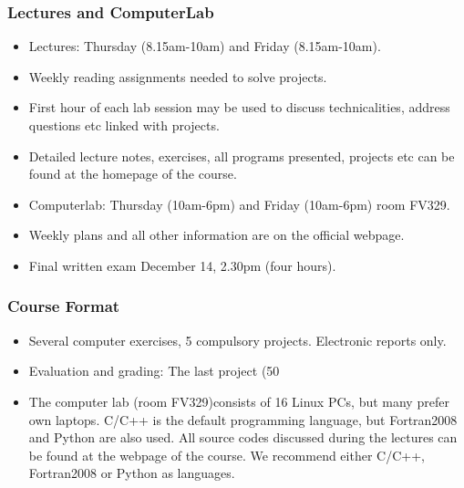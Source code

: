 \documentclass{beamer}
\newenvironment{block_mdfboxadmon}[1][]{\begin{block}{#1}}{\end{block}}
\begin{document}
\begin{frame}
\frametitle{Lectures and ComputerLab}

\begin{block_mdfboxadmon}[]
\begin{itemize}
  \item Lectures: Thursday (8.15am-10am) and Friday (8.15am-10am).

  \item Weekly reading assignments needed to solve projects.

  \item First hour of each lab session may be used to discuss technicalities, address questions etc linked with projects.

  \item Detailed lecture notes, exercises, all programs presented, projects etc can be found at the homepage of the course.

  \item Computerlab: Thursday (10am-6pm) and Friday (10am-6pm) room FV329.

  \item Weekly plans and all other information are on the official webpage.

  \item Final written exam December 14, 2.30pm (four hours).
\end{itemize}

\noindent
\end{block_mdfboxadmon}
\end{frame}

\begin{frame}
\frametitle{Course Format}

\begin{block_mdfboxadmon}[]
\begin{itemize}
  \item Several computer exercises, 5 compulsory projects. Electronic reports only.

  \item Evaluation and grading: The last project (50%

  \item The computer lab (room FV329)consists of 16 Linux PCs, but many prefer own laptops. C/C++ is the default programming language, but Fortran2008 and Python are also used. All source codes discussed during the lectures can be found at the webpage of the course. We recommend either C/C++, Fortran2008 or Python as languages.
\end{itemize}

\noindent
\end{block_mdfboxadmon}
\end{frame}
\end{document}
